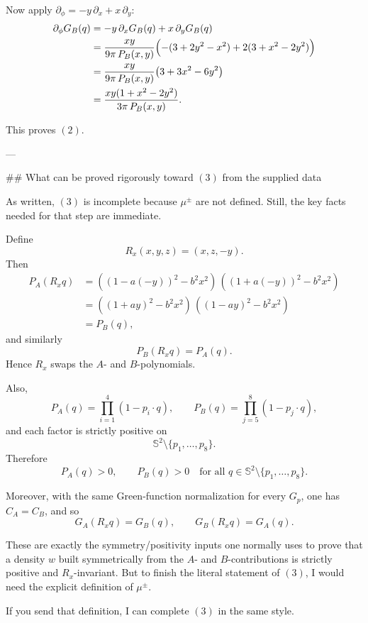 Now apply \(\partial_\phi=-y\,\partial_x+x\,\partial_y\):
\[
\begin{aligned}
\partial_\phi G_B(q)
&=-y\,\partial_x G_B(q)+x\,\partial_y G_B(q) \\
&=\frac{xy}{9\pi\,P_B(x,y)}
\Bigl(-(3+2y^2-x^2)+2(3+x^2-2y^2)\Bigr) \\
&=\frac{xy}{9\pi\,P_B(x,y)}\bigl(3+3x^2-6y^2\bigr) \\
&=\frac{xy(1+x^2-2y^2)}{3\pi\,P_B(x,y)}.
\end{aligned}
\]

This proves \((2)\).

---

## What can be proved rigorously toward \((3)\) from the supplied data

As written, \((3)\) is incomplete because \(\mu^\pm\) are not defined. Still, the key facts needed for that step are immediate.

Define
\[
R_x(x,y,z)=(x,z,-y).
\]
Then
\[
\begin{aligned}
P_A(R_x q)
&=((1-a(-y))^2-b^2x^2)\,((1+a(-y))^2-b^2x^2) \\
&=((1+ay)^2-b^2x^2)\,((1-ay)^2-b^2x^2) \\
&=P_B(q),
\end{aligned}
\]
and similarly
\[
P_B(R_x q)=P_A(q).
\]
Hence \(R_x\) swaps the \(A\)- and \(B\)-polynomials.

Also,
\[
P_A(q)=\prod_{i=1}^4 (1-p_i\cdot q),\qquad
P_B(q)=\prod_{j=5}^8 (1-p_j\cdot q),
\]
and each factor is strictly positive on
\[
\mathbb S^2\setminus\{p_1,\dots,p_8\}.
\]
Therefore
\[
P_A(q)>0,\qquad P_B(q)>0
\quad\text{for all }q\in \mathbb S^2\setminus\{p_1,\dots,p_8\}.
\]

Moreover, with the same Green-function normalization for every \(G_p\), one has \(C_A=C_B\), and so
\[
G_A(R_x q)=G_B(q),\qquad G_B(R_x q)=G_A(q).
\]

These are exactly the symmetry/positivity inputs one normally uses to prove that a density \(w\) built symmetrically from the \(A\)- and \(B\)-contributions is strictly positive and \(R_x\)-invariant. But to finish the literal statement of \((3)\), I would need the explicit definition of \(\mu^\pm\).

If you send that definition, I can complete \((3)\) in the same style.